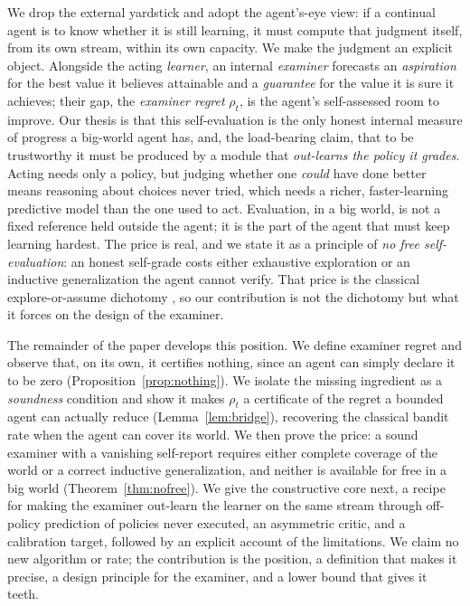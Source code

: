 \documentclass[10pt]{article} %
\theoremstyle{definition}
\theoremstyle{plain}
\begin{document}
We drop the external yardstick and adopt the agent's-eye view: if a continual agent is to know whether it is still learning, it must compute that judgment itself, from its own stream, within its own capacity. We make the judgment an explicit object. Alongside the acting \emph{learner}, an internal \emph{examiner} forecasts an \emph{aspiration} for the best value it believes attainable and a \emph{guarantee} for the value it is sure it achieves; their gap, the \emph{examiner regret} $\rho_t$, is the agent's self-assessed room to improve. Our thesis is that this self-evaluation is the only honest internal measure of progress a big-world agent has, and, the load-bearing claim, that to be trustworthy it must be produced by a module that \emph{out-learns the policy it grades}. Acting needs only a policy, but judging whether one \emph{could} have done better means reasoning about choices never tried, which needs a richer, faster-learning predictive model than the one used to act. Evaluation, in a big world, is not a fixed reference held outside the agent; it is the part of the agent that must keep learning hardest. The price is real, and we state it as a principle of \emph{no free self-evaluation}: an honest self-grade costs either exhaustive exploration or an inductive generalization the agent cannot verify. That price is the classical explore-or-assume dichotomy \citep{kearns2002e3,brafman2002rmax}, so our contribution is not the dichotomy but what it forces on the design of the examiner.

The remainder of the paper develops this position. We define examiner regret and observe that, on its own, it certifies nothing, since an agent can simply declare it to be zero (Proposition~\ref{prop:nothing}). We isolate the missing ingredient as a \emph{soundness} condition and show it makes $\rho_t$ a certificate of the regret a bounded agent can actually reduce (Lemma~\ref{lem:bridge}), recovering the classical bandit rate when the agent can cover its world. We then prove the price: a sound examiner with a vanishing self-report requires either complete coverage of the world or a correct inductive generalization, and neither is available for free in a big world (Theorem~\ref{thm:nofree}). We give the constructive core next, a recipe for making the examiner out-learn the learner on the same stream through off-policy prediction of policies never executed, an asymmetric critic, and a calibration target, followed by an explicit account of the limitations. We claim no new algorithm or rate; the contribution is the position, a definition that makes it precise, a design principle for the examiner, and a lower bound that gives it teeth.
\end{document}
